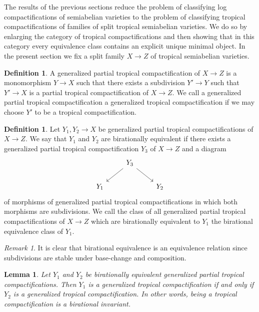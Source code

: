 \documentclass[11pt]{amsart}
\newtheorem{lemma}[theorem]{Lemma}
\theoremstyle{definition}
\newtheorem{definition}[theorem]{Definition}
\theoremstyle{remark}
\newtheorem{remark}[theorem]{Remark}
\begin{document}
The results of the previous sections reduce the problem of classifying log compactifications
of semiabelian varieties to the problem of classifying tropical compactifications of families of split tropical
semiabelian varieties. We do so by enlarging the category of tropical compactifications and then showing
that in this category every equivalence class contains an explicit unique minimal object.
In the present section we fix a split family $X\to Z$ of tropical semiabelian varieties.

\begin{definition}
	A generalized partial tropical compactification of $X\to Z$ is a monomorphism $Y\to X$ such that there exists a
	subdivision $Y'\to Y$ such that $Y'\to X$ is a partial tropical compactification of $X\to Z$.
	We call a generalized partial tropical compactification a generalized tropical compactification if
	we may choose $Y'$ to be a tropical compactification.
\end{definition}

\begin{definition}
	Let $Y_1,Y_2\to X$ be generalized partial tropical compactifications of $X\to Z$. We say that $Y_1$ and $Y_2$ are birationally
	equivalent if there exists a generalized partial tropical compactification $Y_3$ of $X\to Z$ and a diagram
	$$\begin{tikzcd}
		&Y_3\arrow[dr]\arrow[dl]&\\
		Y_1&&Y_2
	\end{tikzcd}$$
	of morphisms of generalized partial tropical compactifications in which both morphisms are subdivisions. We call the class of all generalized partial tropical compactifications
	of $X\to Z$ which are birationally equivalent to $Y_1$ the birational equivalence class of $Y_1$.
\end{definition}

\begin{remark}
	It is clear that birational equivalence is an equivalence relation since subdivisions
	are stable under base-change and composition.
\end{remark}

\begin{lemma}
	\label{lem:cpt_bir_inv}
	Let $Y_1$ and $Y_2$ be birationally equivalent generalized partial tropical compactifications. Then $Y_1$ is a generalized tropical compactification
	if and only if $Y_2$ is a generalized tropical compactification. In other words, being a tropical compactification is a birational invariant.
\end{lemma}
\end{document}
